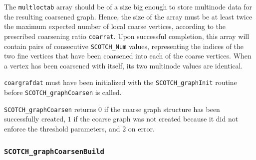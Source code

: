 \begin{itemize}
The {\tt multloctab} array should be of a size big enough to store
multinode data for the resulting coarsened graph. Hence, the size of
the array must be at least twice the maximum expected number of local
coarse vertices, according to the prescribed coarsening ratio
{\tt coarrat}. Upon successful completion, this array will contain
pairs of consecutive {\tt SCOTCH\_\lbt Num} values, representing the
indices of the two fine vertices that have been coarsened into each of
the coarse vertices. When a vertex has been coarsened with itself, its
two multinode values are identical.

{\tt coargrafdat} must have been initialized with the
{\tt SCOTCH\_\lbt graph\lbt Init} routine before
{\tt SCOTCH\_graph\lbt Coarsen} is called.

\progret

{\tt SCOTCH\_graphCoarsen} returns $0$ if the coarse graph
structure has been successfully created, $1$ if the coarse graph was
not created because it did not enforce the threshold parameters, and
$2$ on error.
\end{itemize}

\subsubsection{{\tt SCOTCH\_graphCoarsenBuild}}

